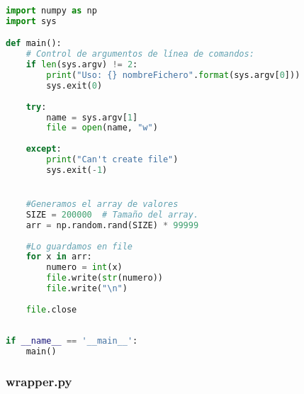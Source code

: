 \documentclass[10pt,journal,compsoc]{IEEEtran}
\begin{document}
\begin{lstlisting}[basicstyle=\tiny,language=Python]
import numpy as np
import sys

def main():   
    # Control de argumentos de línea de comandos:
    if len(sys.argv) != 2:
        print("Uso: {} nombreFichero".format(sys.argv[0]))
        sys.exit(0)
    
    try:
        name = sys.argv[1]
        file = open(name, "w")
        
    except:
        print("Can't create file")
        sys.exit(-1)


    #Generamos el array de valores
    SIZE = 200000  # Tamaño del array.
    arr = np.random.rand(SIZE) * 99999
    
    #Lo guardamos en file
    for x in arr:
        numero = int(x)
        file.write(str(numero))
        file.write("\n")
    
    file.close
    
    
if __name__ == '__main__':
    main()
\end{lstlisting}

\subsubsection{wrapper.py}
\end{document}
